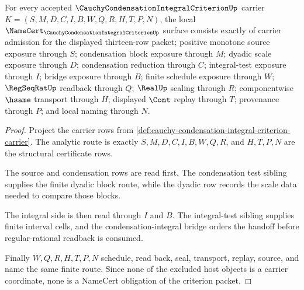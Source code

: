 \begin{theorem}
\label{thm:cauchy-condensation-integral-criterion-namecert-obligations}
For every accepted $\CauchyCondensationIntegralCriterionUp$ carrier $K=(S,M,D,C,I,B,W,Q,R,H,T,P,N)$, the local $\NameCert_{\CauchyCondensationIntegralCriterionUp}$ surface consists exactly of carrier admission for the displayed thirteen-row packet; positive monotone source exposure through $S$; condensation block exposure through $M$; dyadic scale exposure through $D$; condensation reduction through $C$; integral-test exposure through $I$; bridge exposure through $B$; finite schedule exposure through $W$; $\RegSeqRatUp$ readback through $Q$; $\RealUp$ sealing through $R$; componentwise $\hsame$ transport through $H$; displayed $\Cont$ replay through $T$; provenance through $P$; and local naming through $N$.
\end{theorem}
\begin{proof}
Project the carrier rows from \autoref{def:cauchy-condensation-integral-criterion-carrier}. The analytic route is exactly $S,M,D,C,I,B,W,Q,R$, and $H,T,P,N$ are the structural certificate rows.

The source and condensation rows are read first. The condensation test sibling supplies the finite dyadic block route, while the dyadic row records the scale data needed to compare those blocks.

The integral side is then read through $I$ and $B$. The integral-test sibling supplies finite interval cells, and the condensation-integral bridge orders the handoff before regular-rational readback is consumed.

Finally $W,Q,R,H,T,P,N$ schedule, read back, seal, transport, replay, source, and name the same finite route. Since none of the excluded host objects is a carrier coordinate, none is a NameCert obligation of the criterion packet.
\end{proof}

